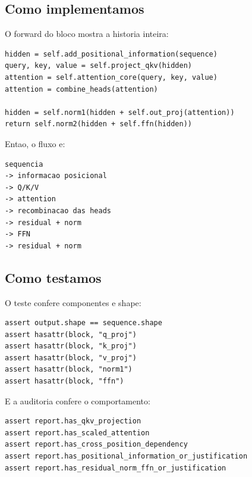 \subsection{Como implementamos}



O forward do bloco mostra a historia inteira:



\begin{Verbatim}[fontsize=\small,breaklines=true,label=python]
hidden = self.add_positional_information(sequence)
query, key, value = self.project_qkv(hidden)
attention = self.attention_core(query, key, value)
attention = combine_heads(attention)

hidden = self.norm1(hidden + self.out_proj(attention))
return self.norm2(hidden + self.ffn(hidden))
\end{Verbatim}



Entao, o fluxo e:



\begin{Verbatim}[fontsize=\small,breaklines=true,label=text]
sequencia
-> informacao posicional
-> Q/K/V
-> attention
-> recombinacao das heads
-> residual + norm
-> FFN
-> residual + norm
\end{Verbatim}



\subsection{Como testamos}



O teste confere componentes e shape:



\begin{Verbatim}[fontsize=\small,breaklines=true,label=python]
assert output.shape == sequence.shape
assert hasattr(block, "q_proj")
assert hasattr(block, "k_proj")
assert hasattr(block, "v_proj")
assert hasattr(block, "norm1")
assert hasattr(block, "ffn")
\end{Verbatim}



E a auditoria confere o comportamento:



\begin{Verbatim}[fontsize=\small,breaklines=true,label=python]
assert report.has_qkv_projection
assert report.has_scaled_attention
assert report.has_cross_position_dependency
assert report.has_positional_information_or_justification
assert report.has_residual_norm_ffn_or_justification
\end{Verbatim}




